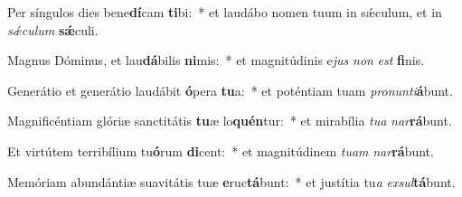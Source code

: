 \item Per síngulos dies bene\textbf{dí}cam \textbf{ti}bi:~* et laudábo nomen tuum in sǽculum, et in \textit{sǽ}\textit{cu}\textit{lum} \textbf{sǽ}culi.
\item Magnus Dóminus, et lau\textbf{dá}bilis \textbf{ni}mis:~* et magnitúdinis e\textit{jus} \textit{non} \textit{est} \textbf{fi}nis.
\item Generátio et generátio laudábit \textbf{ó}pera \textbf{tu}a:~* et poténtiam tuam \textit{pro}\textit{nun}\textit{ti}\textbf{á}bunt.
\item Magnificéntiam glóriæ sanctitátis \textbf{tu}æ lo\textbf{quén}tur:~* et mirabília \textit{tu}\textit{a} \textit{nar}\textbf{rá}bunt.
\item Et virtútem terribílium tu\textbf{ó}rum \textbf{di}cent:~* et magnitúdinem \textit{tu}\textit{am} \textit{nar}\textbf{rá}bunt.
\item Memóriam abundántiæ suavitátis tuæ \textbf{e}ruc\textbf{tá}bunt:~* et justítia tu\textit{a} \textit{ex}\textit{sul}\textbf{tá}bunt.
